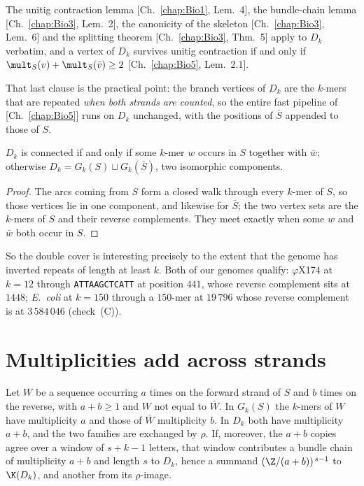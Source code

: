 \begin{corollary}\label{Bio6:cor:applies}
The unitig contraction lemma [Ch.~\ref{chap:Bio1}, Lem.~4], the bundle-chain lemma
[Ch.~\ref{chap:Bio3}, Lem.~2], the canonicity of the skeleton [Ch.~\ref{chap:Bio3}, Lem.~6] and the splitting
theorem [Ch.~\ref{chap:Bio3}, Thm.~5] apply to $D_k$ verbatim, and a vertex of $D_k$ survives unitig
contraction if and only if $\mult_S(v)+\mult_S(\bar v)\ge2$ [Ch.~\ref{chap:Bio5}, Lem.~2.1].
\end{corollary}

That last clause is the practical point: the branch vertices of $D_k$ are the $k$-mers
that are repeated \emph{when both strands are counted}, so the entire fast pipeline of
[Ch.~\ref{chap:Bio5}] runs on $D_k$ unchanged, with the positions of $\bar S$ appended to those of
$S$.

\begin{proposition}\label{Bio6:prop:conn}
$D_k$ is connected if and only if some $k$-mer $w$ occurs in $S$ together with $\bar w$;
otherwise $D_k=G_k(S)\sqcup G_k(\bar S)$, two isomorphic components.
\end{proposition}

\begin{proof}
The arcs coming from $S$ form a closed walk through every $k$-mer of $S$, so those
vertices lie in one component, and likewise for $\bar S$; the two vertex sets are the
$k$-mers of $S$ and their reverse complements. They meet exactly when some $w$ and
$\bar w$ both occur in $S$.
\end{proof}

So the double cover is interesting precisely to the extent that the genome has inverted
repeats of length at least $k$. Both of our genomes qualify: $\varphi$X174 at $k=12$
through \texttt{ATTAAGCTCATT} at position $441$, whose reverse complement sits at $1448$;
\emph{E.\ coli} at $k=150$ through a $150$-mer at $19\,796$ whose reverse complement is at
$3\,584\,046$ (check~(C)).

\section{Multiplicities add across strands}\label{Bio6:sec:merge}

\begin{theorem}\label{Bio6:thm:merge}
Let $W$ be a sequence occurring $a$ times on the forward strand of $S$ and $b$ times on the
reverse, with $a+b\ge1$ and $W$ not equal to $\bar W$. In $G_k(S)$ the $k$-mers of $W$
have multiplicity $a$ and those of $\bar W$ multiplicity $b$. In $D_k$ both have
multiplicity $a+b$, and the two families are exchanged by $\rho$. If, moreover, the $a+b$
copies agree over a window of $s+k-1$ letters, that window contributes a bundle chain of
multiplicity $a+b$ and length $s$ to $D_k$, hence a summand $(\Z/(a+b))^{\,s-1}$ to
$\K(D_k)$, and another from its $\rho$-image.
\end{theorem}

